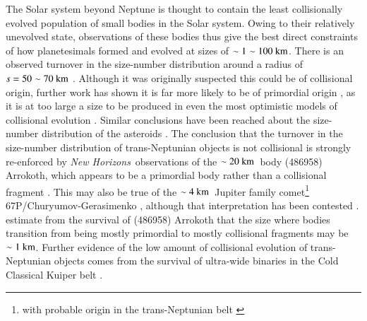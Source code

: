 \documentclass[printer]{aa}
\begin{document}
The Solar system beyond Neptune is thought to contain the least collisionally evolved population of small bodies in the Solar system.  Owing to their relatively unevolved state, observations of these bodies thus give the best direct constraints of how planetesimals formed and evolved at sizes of $\sim 1 \sim 100~\rm{km}$.  There is an observed turnover in the size-number distribution around a radius of $s = 50 \sim 70~\rm{km}$ \citep{2004AJ....128.1364B,2014ApJ...782..100F}.  Although it was originally suspected this could be of collisional origin, further work has shown it is far more likely to be of primordial origin \citep{2012A&A...540A..30V}, as it is at too large a size to be produced in even the most optimistic models of collisional evolution \citep{2005Icar..173..342P}.  Similar conclusions have been reached about the size-number distribution of the  asteroids \citep{2009Icar..204..558M}.  The conclusion that the turnover in the size-number distribution of trans-Neptunian objects is not collisional is strongly re-enforced  by \textit{New Horizons}~observations of the $\sim 20~\rm{km}$~body (486958) Arrokoth, which appears to be a primordial body rather than a collisional fragment \citep{2019Sci...364.9771S}. This may also be true of the $\sim 4~\rm{km}$~Jupiter family comet\footnote{with probable origin in the trans-Neptunian belt \citep{1997Sci...276.1670D}} 67P/Churyumov-Gerasimenko \citep{2015Natur.526..402M}, although that interpretation has been contested \citep{2017A&A...597A..62J}.  \citet{2021Icar..35614256M} estimate from the survival of (486958) Arrokoth that the size where bodies transition from being mostly primordial to mostly collisional fragments may be $\sim 1~\rm{km}$.  Further evidence of the low amount of collisional evolution of trans-Neptunian objects comes from the survival of ultra-wide binaries in the Cold Classical Kuiper belt \citep{2012ApJ...744..139P}.  %
\end{document}
